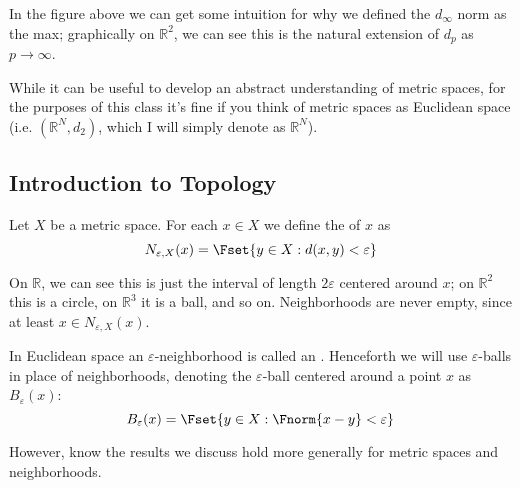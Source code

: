 \documentclass{article}
\begin{document}
\begin{enumerate}
\begin{figure}[H]
    \end{figure}

    In the figure above we can get some intuition for why we defined the $d_{\infty}$ norm as the max; graphically on $\mathbb{R}^2$, we can see this is the natural extension of $d_p$ as $p \to \infty$.
\end{enumerate}

While it can be useful to develop an abstract understanding of metric spaces, for the purposes of this class it's fine if you think of metric spaces as Euclidean space (i.e. $(\mathbb{R}^N, d_2)$, which I will simply denote as $\mathbb{R}^N$).

\subsection{Introduction to Topology}
\label{sub:introduction_to_topology}

\begin{definition}\label{def:lecture1_neighborhood}
  Let $X$ be a metric space. For each $x \in X$ we define the  of $x$ as
  \[
    N_{\varepsilon, X}(x) = \Fset{y \in X: d(x, y) < \varepsilon}
  \]
\end{definition}

On $\mathbb{R}$, we can see this is just the interval of length $2\varepsilon$ centered around $x$; on $\mathbb{R}^2$ this is a circle, on $\mathbb{R}^3$ it is a ball, and so on. Neighborhoods are never empty, since at least $x \in N_{\varepsilon, X}(x)$.
\begin{remark}
  In Euclidean space an $\varepsilon$-neighborhood is called an . Henceforth we will use $\varepsilon$-balls in place of neighborhoods, denoting the $\varepsilon$-ball centered around a point $x$ as $B_{\varepsilon}(x)$:
  \[
    B_{\varepsilon}(x) = \Fset{y \in X: \Fnorm{x - y} < \varepsilon}
  \]

  However, know the results we discuss hold more generally for metric spaces and neighborhoods.
\end{remark}
\end{document}

